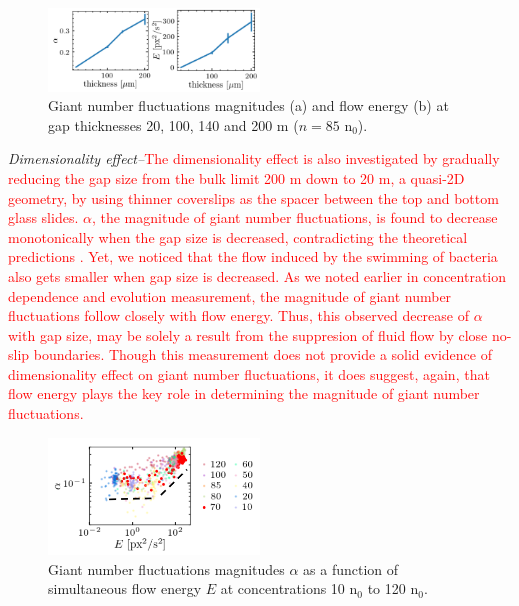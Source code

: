 \documentclass[twocolumn,aps,prl,amsmath,amssymb,longbibliography]{revtex4-2}
\begin{document}
\begin{figure}[!]
\begin{center}
\includegraphics[width=0.5\textwidth]{figures/fig-6-v1.png}
\caption[]{Giant number fluctuations magnitudes (a) and flow energy (b) at gap thicknesses 20, 100, 140 and 200 \textmu m ($n=85$ n$_0$).}
\label{fig:6}
\end{center}
\end{figure}

\textit{Dimensionality effect--}\textcolor{red}{The dimensionality effect is also investigated by gradually reducing the gap size from the bulk limit 200 \textmu m down to 20 \textmu m, a quasi-2D geometry, by using thinner coverslips as the spacer between the top and bottom glass slides. $\alpha$, the magnitude of giant number fluctuations, is found to decrease monotonically when the gap size is decreased, contradicting the theoretical predictions \cite{PhysRevLett.89.058101}. Yet, we noticed that the flow induced by the swimming of bacteria also gets smaller when gap size is decreased. As we noted earlier in concentration dependence and evolution measurement, the magnitude of giant number fluctuations follow closely with flow energy. Thus, this observed decrease of $\alpha$ with gap size, may be solely a result from the suppresion of fluid flow by close no-slip boundaries. Though this measurement does not provide a solid evidence of dimensionality effect on giant number fluctuations, it does suggest, again, that flow energy plays the key role in determining the magnitude of giant number fluctuations.}

\begin{figure}[!]
\begin{center}
\includegraphics[width=0.5\textwidth]{figures/fig-7-v1.png}
\caption[]{Giant number fluctuations magnitudes $\alpha$ as a function of simultaneous flow energy $E$ at concentrations 10 n$_0$ to 120 n$_0$.}
\label{fig:7}
\end{center}
\end{figure}
\end{document}
